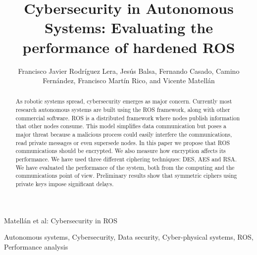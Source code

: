\documentclass[journal,twoside]{JoPhA}
\begin{document}
\title{Cybersecurity in Autonomous Systems: Evaluating the performance of hardened ROS}

\author{Francisco Javier Rodr\'iguez Lera, Jes\'us Balsa, Fernando Casado, Camino Fern\'andez, Francisco Martín Rico, and Vicente Matell\'an
}






%
{Matell\'an et al: Cybersecurity in ROS}
\maketitle


\begin{abstract}
As robotic systems spread, cybersecurity emerges as major concern. Currently most research autonomous systems are built using the ROS framework, along with other commercial software. 
ROS is a distributed framework where nodes publish information that other nodes consume. 
This model simplifies data communication but poses a major threat because a malicious process could easily interfere the communications, read private messages or even supersede nodes. In this paper we propose that ROS communications should be encrypted. We also measure how encryption affects its performance. We have used three different ciphering techniques: DES, AES and RSA. We have evaluated the performance of the system, both from the computing and the communications point of view. Preliminary results show that symmetric ciphers using private keys impose significant delays.
\end{abstract}


\begin{IEEEkeywords}
Autonomous systems, Cybersecurity, Data security, Cyber-physical systems, ROS, Performance analysis
\end{IEEEkeywords}
\end{document}
